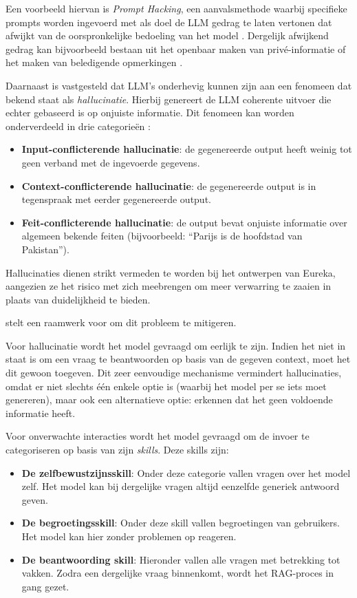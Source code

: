 Een voorbeeld hiervan is \emph{Prompt Hacking}, een aanvalsmethode waarbij specifieke prompts worden ingevoerd met als doel de LLM gedrag te laten vertonen dat afwijkt van de oorspronkelijke bedoeling van het model \autocite{Rababah2024}. Dergelijk afwijkend gedrag kan bijvoorbeeld bestaan uit het openbaar maken van privé-informatie of het maken van beledigende opmerkingen \autocite{Naveed2023}.

Daarnaast is vastgesteld dat LLM's onderhevig kunnen zijn aan een fenomeen dat bekend staat als \emph{hallucinatie}. Hierbij genereert de LLM coherente uitvoer die echter gebaseerd is op onjuiste informatie. Dit fenomeen kan worden onderverdeeld in drie categorieën \autocite{Naveed2023}:

\begin{itemize} 
    \item \textbf{Input-conflicterende hallucinatie}: de gegenereerde output heeft weinig tot geen verband met de ingevoerde gegevens. 
    \item \textbf{Context-conflicterende hallucinatie}: de gegenereerde output is in tegenspraak met eerder gegenereerde output. 
    \item \textbf{Feit-conflicterende hallucinatie}: de output bevat onjuiste informatie over algemeen bekende feiten (bijvoorbeeld: ``Parijs is de hoofdstad van Pakistan''). 
\end{itemize}

Hallucinaties dienen strikt vermeden te worden bij het ontwerpen van Eureka, aangezien ze het risico met zich meebrengen om meer verwarring te zaaien in plaats van duidelijkheid te bieden.

\textcite{Taneja2024} stelt een raamwerk voor om dit probleem te mitigeren.

Voor hallucinatie wordt het model gevraagd om eerlijk te zijn. Indien het niet in staat is om een vraag te beantwoorden op basis van de gegeven context, moet het dit gewoon toegeven. Dit zeer eenvoudige mechanisme vermindert hallucinaties, omdat er niet slechts één enkele optie is (waarbij het model per se iets moet genereren), maar ook een alternatieve optie: erkennen dat het geen voldoende informatie heeft.

Voor onverwachte interacties wordt het model gevraagd om de invoer te categoriseren op basis van zijn \emph{skills}. Deze skills zijn:

\begin{itemize}
    \item \textbf{De zelfbewustzijnsskill}: Onder deze categorie vallen vragen over het model zelf. Het model kan bij dergelijke vragen altijd eenzelfde generiek antwoord geven.
    \item \textbf{De begroetingsskill}: Onder deze skill vallen begroetingen van gebruikers. Het model kan hier zonder problemen op reageren.
    \item \textbf{De beantwoording skill}: Hieronder vallen alle vragen met betrekking tot vakken. Zodra een dergelijke vraag binnenkomt, wordt het RAG-proces in gang gezet.
\end{itemize}

